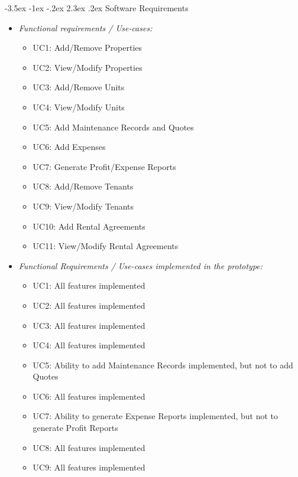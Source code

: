 \documentclass[11pt]{article}
\makeatletter
\renewcommand\section{\@startsection{section}{1}{\z@}%
                                  {-3.5ex \@plus -1ex \@minus -.2ex}%
                                  {2.3ex \@plus.2ex}%
                                  {\normalfont\large\bfseries}}
\renewcommand\section{\@startsection{section}{1}{\z@}%
                                  {-3.5ex \@plus -1ex \@minus -.2ex}%
                                  {2.3ex \@plus.2ex}%
                                  {\normalfont\large\bfseries}}
\makeatother
\begin{document}
\section{Software Requirements}
    \begin{itemize}
        \item \textit{Functional requirements / Use-cases:}
            \begin{itemize}
                \item UC1: Add/Remove Properties
                \item UC2: View/Modify Properties 
                \item UC3: Add/Remove Units  
                \item UC4: View/Modify Units
                \item UC5: Add Maintenance Records and Quotes
                \item UC6: Add Expenses
                \item UC7: Generate Profit/Expense Reports
                \item UC8: Add/Remove Tenants
                \item UC9: View/Modify Tenants
                \item UC10: Add Rental Agreements
                \item UC11: View/Modify Rental Agreements
            \end{itemize}
        \item \textit{Functional Requirements / Use-cases implemented in the prototype:} 
            \begin{itemize}
                \item UC1: All features implemented
                \item UC2: All features implemented
                \item UC3: All features implemented
                \item UC4: All features implemented
                \item UC5: Ability to add Maintenance Records implemented, but not to add Quotes
                \item UC6: All features implemented
                \item UC7: Ability to generate Expense Reports implemented, but not to generate Profit Reports
                \item UC8: All features implemented
                \item UC9: All features implemented

\end{itemize}
\end{itemize}
\end{document}
